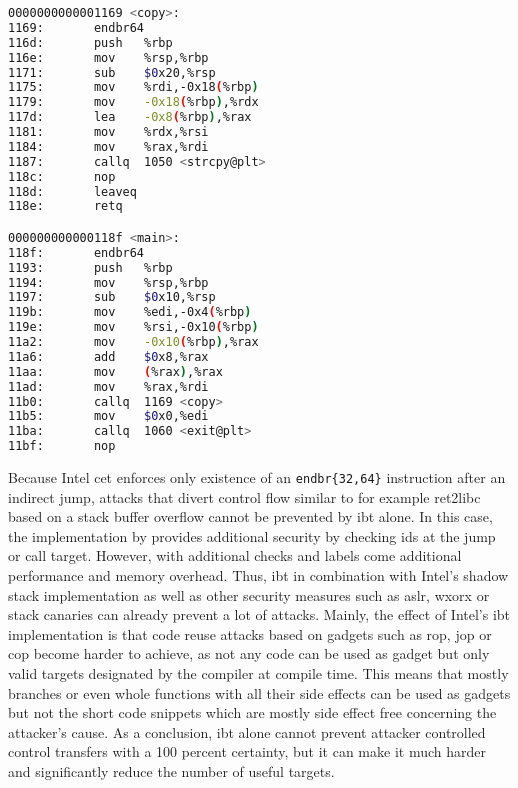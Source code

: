 \begin{lstlisting}[language=bash,float=ht,caption={Disassembly excerpt of the 64 bit binary compiled from the code in \cref{lst:optimization} with \texttt{gcc -o copy optimization.c -fno-stack-protector -fcf-protection=full}, retrieved with \texttt{objdump -D -{}-no-show-raw-\linebreak[0]insn copy} (cf. \cref{lst:optimization-disassembly} compiled without \acs{ibt} support)}, label={lst:optimization-disassembly-ibt}]
0000000000001169 <copy>:
1169:       endbr64
116d:       push   %rbp
116e:       mov    %rsp,%rbp
1171:       sub    $0x20,%rsp
1175:       mov    %rdi,-0x18(%rbp)
1179:       mov    -0x18(%rbp),%rdx
117d:       lea    -0x8(%rbp),%rax
1181:       mov    %rdx,%rsi
1184:       mov    %rax,%rdi
1187:       callq  1050 <strcpy@plt>
118c:       nop
118d:       leaveq
118e:       retq

000000000000118f <main>:
118f:       endbr64
1193:       push   %rbp
1194:       mov    %rsp,%rbp
1197:       sub    $0x10,%rsp
119b:       mov    %edi,-0x4(%rbp)
119e:       mov    %rsi,-0x10(%rbp)
11a2:       mov    -0x10(%rbp),%rax
11a6:       add    $0x8,%rax
11aa:       mov    (%rax),%rax
11ad:       mov    %rax,%rdi
11b0:       callq  1169 <copy>
11b5:       mov    $0x0,%edi
11ba:       callq  1060 <exit@plt>
11bf:       nop
\end{lstlisting}

Because Intel \gls{cet} enforces only existence of an \texttt{endbr\{32,64\}} instruction after an indirect jump, attacks that divert control flow similar to for example \gls{ret2libc} based on a stack buffer overflow cannot be prevented by \gls{ibt} alone.
In this case, the implementation by \citeauthor{Abadi2005} provides additional security by checking \glspl{id} at the jump or call target.
However, with additional checks and labels come additional performance and memory overhead.
Thus, \gls{ibt} in combination with Intel's shadow stack implementation as well as other security measures such as \gls{aslr}, \gls{wxorx} or stack canaries can already prevent a lot of attacks.
Mainly, the effect of Intel's \gls{ibt} implementation is that code reuse attacks based on gadgets such as \gls{rop}, \gls{jop} or \gls{cop} become harder to achieve, as not any code can be used as gadget but only valid targets designated by the compiler at compile time.
This means that mostly branches or even whole functions with all their side effects can be used as gadgets but not the short code snippets which are mostly side effect free concerning the attacker's cause.
As a conclusion, \gls{ibt} alone cannot prevent attacker controlled control transfers with a 100 percent certainty, but it can make it much harder and significantly reduce the number of useful targets.

